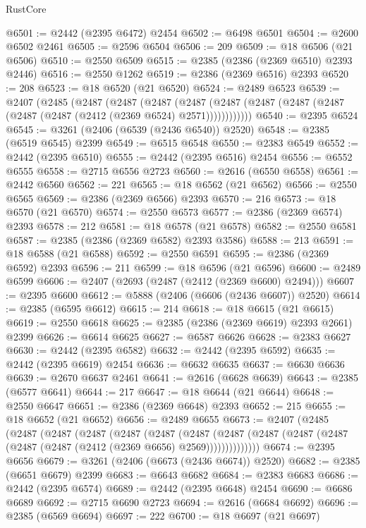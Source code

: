 \begin{lexlean}{RustCore}
\begin{coremodule}
@6501 := @2442 (@2395 @6472) @2454
@6502 := @6498 @6501
@6504 := @2600 @6502 @2461
@6505 := @2596 @6504
@6506 := 209
@6509 := @18 @6506 (@21 @6506)
@6510 := @2550 @6509
@6515 := @2385 (@2386 (@2369 @6510) @2393 @2446)
@6516 := @2550 @1262
@6519 := @2386 (@2369 @6516) @2393
@6520 := 208
@6523 := @18 @6520 (@21 @6520)
@6524 := @2489 @6523
@6539 := @2407
    (@2485
      (@2487
        (@2487
          (@2487
            (@2487 (@2487 (@2487 (@2487 (@2487 (@2487 (@2487 (@2412 (@2369 @6524) @2571))))))))))))
@6540 := @2395 @6524
@6545 := @3261 (@2406 (@6539 (@2436 @6540)) @2520)
@6548 := @2385 (@6519 @6545) @2399
@6549 := @6515 @6548
@6550 := @2383 @6549
@6552 := @2442 (@2395 @6510)
@6555 := @2442 (@2395 @6516) @2454
@6556 := @6552 @6555
@6558 := @2715 @6556 @2723
@6560 := @2616 (@6550 @6558)
@6561 := @2442 @6560
@6562 := 221
@6565 := @18 @6562 (@21 @6562)
@6566 := @2550 @6565
@6569 := @2386 (@2369 @6566) @2393
@6570 := 216
@6573 := @18 @6570 (@21 @6570)
@6574 := @2550 @6573
@6577 := @2386 (@2369 @6574) @2393
@6578 := 212
@6581 := @18 @6578 (@21 @6578)
@6582 := @2550 @6581
@6587 := @2385 (@2386 (@2369 @6582) @2393 @3586)
@6588 := 213
@6591 := @18 @6588 (@21 @6588)
@6592 := @2550 @6591
@6595 := @2386 (@2369 @6592) @2393
@6596 := 211
@6599 := @18 @6596 (@21 @6596)
@6600 := @2489 @6599
@6606 := @2407 (@2693 (@2487 (@2412 (@2369 @6600) @2494)))
@6607 := @2395 @6600
@6612 := @5888 (@2406 (@6606 (@2436 @6607)) @2520)
@6614 := @2385 (@6595 @6612)
@6615 := 214
@6618 := @18 @6615 (@21 @6615)
@6619 := @2550 @6618
@6625 := @2385 (@2386 (@2369 @6619) @2393 @2661) @2399
@6626 := @6614 @6625
@6627 := @6587 @6626
@6628 := @2383 @6627
@6630 := @2442 (@2395 @6582)
@6632 := @2442 (@2395 @6592)
@6635 := @2442 (@2395 @6619) @2454
@6636 := @6632 @6635
@6637 := @6630 @6636
@6639 := @2670 @6637 @2461
@6641 := @2616 (@6628 @6639)
@6643 := @2385 (@6577 @6641)
@6644 := 217
@6647 := @18 @6644 (@21 @6644)
@6648 := @2550 @6647
@6651 := @2386 (@2369 @6648) @2393
@6652 := 215
@6655 := @18 @6652 (@21 @6652)
@6656 := @2489 @6655
@6673 := @2407
    (@2485
      (@2487
        (@2487
          (@2487
            (@2487
              (@2487
                (@2487
                  (@2487 (@2487 (@2487 (@2487 (@2487 (@2487 (@2412 (@2369 @6656) @2569))))))))))))))
@6674 := @2395 @6656
@6679 := @3261 (@2406 (@6673 (@2436 @6674)) @2520)
@6682 := @2385 (@6651 @6679) @2399
@6683 := @6643 @6682
@6684 := @2383 @6683
@6686 := @2442 (@2395 @6574)
@6689 := @2442 (@2395 @6648) @2454
@6690 := @6686 @6689
@6692 := @2715 @6690 @2723
@6694 := @2616 (@6684 @6692)
@6696 := @2385 (@6569 @6694)
@6697 := 222
@6700 := @18 @6697 (@21 @6697)

\end{coremodule}
\end{lexlean}
